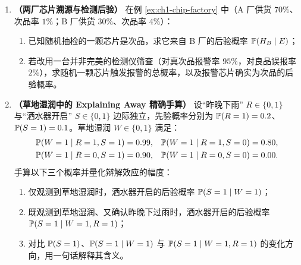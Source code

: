 \begin{enumerate}[label=\textbf{1.\arabic*}, leftmargin=2.4em, resume]
  \item \textbf{（两厂芯片溯源与检测后验）} 在例 \ref{ex:ch1-chip-factory} 中（A 厂供货 $70\%$、次品率 $1\%$；B 厂供货 $30\%$、次品率 $4\%$）：
  \begin{enumerate}[label=(\arabic*), leftmargin=1.8em]
    \item 已知随机抽检的一颗芯片是次品，求它来自 B 厂的后验概率 $\mathbb{P}(H_B \mid E)$；
    \item 若改用一台并非完美的检测仪筛查（对真次品报警率 $95\%$，对良品误报率 $2\%$），求随机一颗芯片触发报警的总概率，以及报警芯片确实为次品的后验概率。
  \end{enumerate}

  \item \textbf{（草地湿润中的 Explaining Away 精确手算）} 设“昨晚下雨” $R \in \{0,1\}$ 与“洒水器开启” $S \in \{0,1\}$ 边际独立，先验概率分别为 $\mathbb{P}(R=1) = 0.2$、$\mathbb{P}(S=1) = 0.1$。草地湿润 $W \in \{0,1\}$ 满足：
  \begin{align*}
    \mathbb{P}(W=1\mid R=1, S=1) &= 0.99, & \mathbb{P}(W=1\mid R=1, S=0) &= 0.80, \\
    \mathbb{P}(W=1\mid R=0, S=1) &= 0.90, & \mathbb{P}(W=1\mid R=0, S=0) &= 0.00.
  \end{align*}
  手算以下三个概率并量化辩解效应的幅度：
  \begin{enumerate}[label=(\arabic*), leftmargin=1.8em]
    \item 仅观测到草地湿润时，洒水器开启的后验概率 $\mathbb{P}(S=1 \mid W=1)$；
    \item 既观测到草地湿润、又确认昨晚下过雨时，洒水器开启的后验概率 $\mathbb{P}(S=1 \mid W=1, R=1)$；
    \item 对比 $\mathbb{P}(S=1)$、$\mathbb{P}(S=1\mid W=1)$ 与 $\mathbb{P}(S=1\mid W=1, R=1)$ 的变化方向，用一句话解释其含义。
  \end{enumerate}
\end{enumerate}


